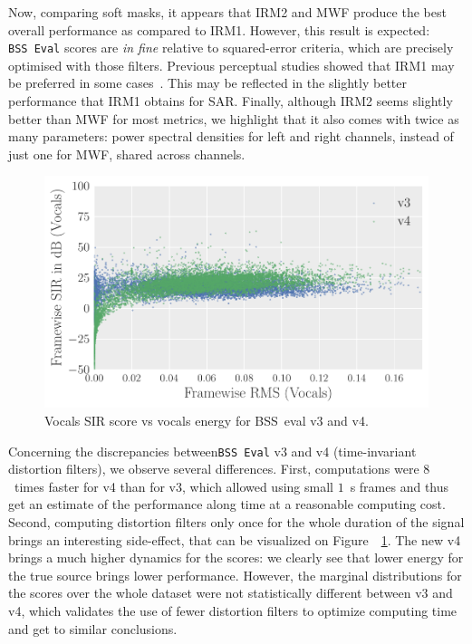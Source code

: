 \documentclass{article}
\begin{document}
Now, comparing soft masks, it appears that IRM2 and MWF produce the best overall performance as compared to IRM1. However, this result is expected: \texttt{BSS~Eval} scores are \textit{in fine} relative to squared-error criteria, which are precisely optimised with those filters. Previous perceptual studies showed that IRM1 may be preferred in some cases~\cite{liutkus15}. This may be reflected in the slightly better performance that IRM1 obtains for SAR. Finally, although IRM2 seems slightly better than MWF for most metrics, we highlight that it also comes with twice as many parameters: power spectral densities for left and right channels, instead of just one for MWF, shared across channels.

\begin{figure}[ht]
  \begin{center}
     \includegraphics[width=0.7\linewidth]{fig/evaluation_v3v4.pdf}
     \vspace{-1cm}
  \end{center}
  \caption{Vocals SIR score vs vocals energy for BSS~eval v3 and v4.  }
  \label{fig:v3v4}
\end{figure}

Concerning the discrepancies between\texttt{BSS~Eval} v3 and v4 (time-invariant distortion filters), we observe several differences. First, computations were $8$~times faster for v4 than for v3, which allowed using small $1$~s frames and thus get an estimate of the performance along time at a reasonable computing cost. Second, computing distortion filters only once for the whole duration of the signal brings an interesting side-effect, that can be visualized on Figure~~\ref{fig:v3v4}. The new v4 brings a much higher dynamics for the scores: we clearly see that lower energy for the true source brings lower performance. However, the marginal distributions for the scores over the whole dataset were not statistically different between v3 and v4, which validates the use of fewer distortion filters to optimize computing time and get to similar conclusions.
\end{document}

